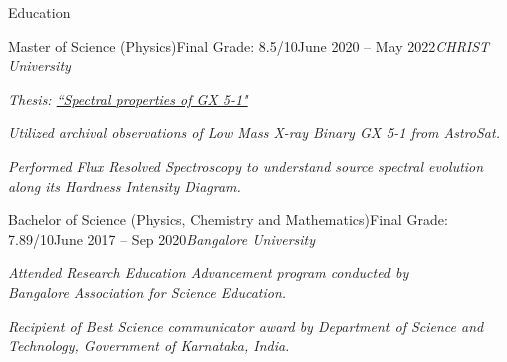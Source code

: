 \begin{section}{Education}

    \begin{subsection}{Master of Science (Physics)}{Final Grade: 8.5/10}{June 2020 -- May 2022}{\textit{CHRIST University}}
        \item \emph{Thesis: \href{https://drive.google.com/file/d/1FP9Bz25hufUrWuRfMA0RLzUTm0Spqp-I/view?usp=sharing}{``Spectral properties of GX 5-1"}} %
        \item \textit{Utilized archival observations of Low Mass X-ray Binary GX 5-1 from \textit{AstroSat}.}
        \item \textit{Performed Flux Resolved Spectroscopy to understand source spectral evolution along its Hardness Intensity Diagram.}
    \end{subsection}


    \begin{subsection}{Bachelor of Science (Physics, Chemistry and Mathematics)}{Final Grade: 7.89/10}{June 2017 -- Sep 2020}{\textit{Bangalore University}}
        \item \textit{Attended Research Education Advancement program conducted by \\ Bangalore Association for Science Education.}
        \item \textit{Recipient of Best Science communicator award by Department of Science and Technology, Government of Karnataka, India.}
    \end{subsection}

\end{section}